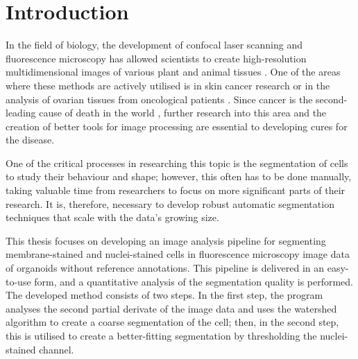 \documentclass[
  digital,     %
  oneside,     %
  nosansbold,  %
  nocolorbold, %
  lof,         %
  lot,         %
]{fithesis4}
\begin{document}
\chapter*{Introduction}

In the field of biology, the development of confocal laser scanning and
fluorescence microscopy has allowed scientists to create high-resolution multidimensional images of various plant and animal tissues \cite{stegmaier2016}. One of the areas where these methods are actively utilised is in skin cancer research \cite{gupta2020} or in the analysis of ovarian tissues from oncological patients \cite{fabbri2014}. Since cancer is the second-leading cause of death in the world \cite{mayo-clinic-cancer}, further research into this area and the creation of better tools for image processing are essential to developing cures for the disease.

One of the critical processes in researching this topic is the segmentation of cells to study their behaviour and shape; however, this often has to be done manually, taking valuable time from researchers to focus on more significant parts of their research. It is, therefore, necessary to develop robust automatic segmentation techniques that scale with the data's growing size.

This thesis focuses on developing an image analysis pipeline for segmenting membrane-stained and nuclei-stained cells in fluorescence microscopy image data of organoids without reference annotations. This pipeline is delivered in an easy-to-use form, and a quantitative analysis of the segmentation quality is performed. The developed method consists of two steps. In the first step, the program analyses the second partial derivate of the image data and uses the watershed algorithm to create a coarse segmentation of the cell; then, in the second step, this is utilised to create a better-fitting segmentation by thresholding the nuclei-stained channel.
\end{document}
